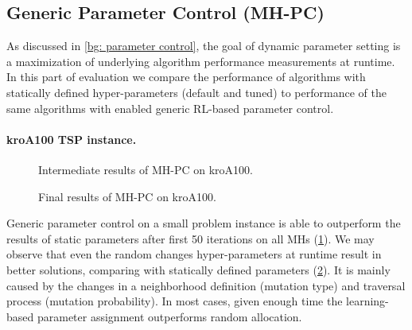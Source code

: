 \subsection{Generic Parameter Control (MH-PC)}\label{eval:1:PC}
As discussed in \cref{bg: parameter control}, the goal of dynamic parameter setting is a maximization of underlying algorithm performance measurements at runtime. In this part of evaluation we compare the performance of algorithms with statically defined hyper-parameters (default and tuned) to performance of the same algorithms with enabled generic RL-based parameter control.

\paragraph{kroA100 TSP instance.}
\begin{figure}[t]
	\centering
	\vspace{-20pt}
	
	\caption{Intermediate results of MH-PC on kroA100.}
	\vspace{-5pt}
	\label{eval:pict:pc:kroA100 intermediate}
\end{figure}
\begin{figure}[b]
	\centering
	\vspace{-20pt}
	
	\caption{Final results of MH-PC on kroA100.}
	\vspace{-5pt}
	\label{eval:pict:pc:kroA100 final}
\end{figure}

Generic parameter control on a small problem instance is able to outperform the results of static parameters after first 50 iterations on all MHs (\cref{eval:pict:pc:kroA100 intermediate}). We may observe that even the random changes hyper-parameters at runtime result in better solutions, comparing with statically defined parameters (\cref{eval:pict:pc:kroA100 final}). It is mainly caused by the changes in a neighborhood definition (mutation type) and traversal process (mutation probability). In most cases, given enough time the learning-based parameter assignment outperforms random allocation.

